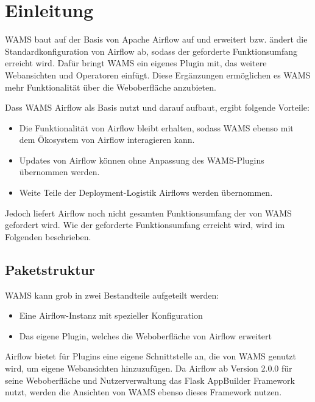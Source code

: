 \chapter{Einleitung}
WAMS baut auf der Basis von \Gls{Apache Airflow} auf und erweitert bzw. ändert die Standardkonfiguration von Airflow ab, sodass der geforderte Funktionsumfang erreicht wird.
Dafür bringt WAMS ein eigenes Plugin mit, das weitere Webansichten und Operatoren einfügt.
Diese Ergänzungen ermöglichen es WAMS mehr Funktionalität über die Weboberfläche anzubieten.

Dass WAMS Airflow als Basis nutzt und darauf aufbaut, ergibt folgende Vorteile:
\begin{itemize}
    \item Die Funktionalität von Airflow bleibt erhalten, sodass WAMS ebenso mit dem Ökosystem von Airflow interagieren kann.
    \item Updates von Airflow können ohne Anpassung des WAMS-Plugins übernommen werden.
    \item Weite Teile der Deployment-Logistik Airflows werden übernommen.
\end{itemize}
Jedoch liefert Airflow noch nicht gesamten Funktionsumfang der von WAMS gefordert wird. Wie der geforderte Funktionsumfang erreicht wird, wird im Folgenden beschrieben.

%

\section{Paketstruktur}

WAMS kann grob in zwei Bestandteile aufgeteilt werden:
\begin{itemize}
    \item Eine Airflow-Instanz mit spezieller Konfiguration
    \item Das eigene Plugin, welches die Weboberfläche von Airflow erweitert
\end{itemize}

Airflow bietet für Plugins eine eigene Schnittstelle an, die von WAMS genutzt wird, um eigene 
Webansichten hinzuzufügen. Da Airflow ab Version 2.0.0 für seine Weboberfläche und Nutzerverwaltung
das Flask AppBuilder Framework nutzt, werden die Ansichten von WAMS ebenso dieses Framework nutzen.

